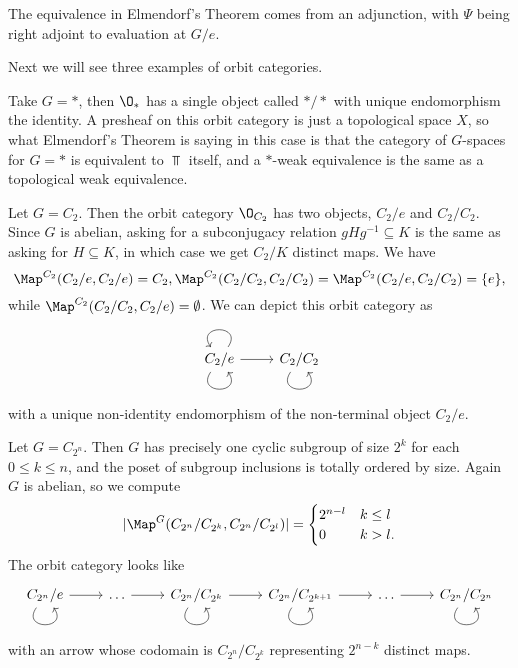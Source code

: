 \begin{remark}
    The equivalence in Elmendorf's Theorem comes from an adjunction, with $\Psi$ being right adjoint to evaluation at $G/e$.
\end{remark}

Next we will see three examples of orbit categories. 

\begin{example}[$\O_*$]
    Take $G = *$, then $\O_*$ has a single object called $*/*$ with unique endomorphism the identity. A presheaf on this orbit category is just a topological space $X$, so what Elmendorf's Theorem is saying in this case is that the category of $G$-spaces for $G = *$ is equivalent to $\Top$ itself, and a $*$-weak equivalence is the same as a topological weak equivalence.
\end{example}

\begin{example}[$\O_{C_2}$] Let $G = C_2$. Then the orbit category $\O_{C_2}$ has two objects, $C_2/e$ and $C_2/C_2$. Since $G$ is abelian, asking for a subconjugacy relation $gHg^{-1} \subseteq K$ is the same as asking for $H \subseteq K$, in which case we get $C_2/K$ distinct maps. We have 
    \[\Map^{C_2}(C_2/e, C_2/e) = C_2, \Map^{C_2}(C_2/C_2, C_2/C_2) = \Map^{C_2}(C_2/e, C_2/C_2) = \{e\},\]
    while $\Map^{C_2}(C_2/C_2, C_2/e) = \emptyset$. We can depict this orbit category as 
    \[\begin{tikzcd}
        C_2/e \arrow[r] \arrow[loop, distance=2em, in=305, out=235] \arrow[loop, distance=2em, in=125, out=55] & C_2/C_2 \arrow[loop, distance=2em, in=305, out=235]
        \end{tikzcd}\]
    with a unique non-identity endomorphism of the non-terminal object $C_2/e$.
\end{example}

\begin{example}[$\O_{C_{2^n}}$]\label{ex: orbit of C2n}
    Let $G = C_{2^n}$. Then $G$ has precisely one cyclic subgroup of size $2^k$ for each $0 \leq k \leq n$, and the poset of subgroup inclusions is totally ordered by size. Again $G$ is abelian, so we compute 
    \[|\Map^G(C_{2^n}/C_{2^k}, C_{2^n}/C_{2^l})| = \begin{cases} 2^{n-l} & k \leq l \\ 0 & k > l. \end{cases}\] 
    The orbit category looks like
    \[\begin{tikzcd}
    C_{2^n}/e \arrow[r] \arrow[loop, distance=2em, in=305, out=235] & \ldots \arrow[r] & C_{2^n}/C_{2^k} \arrow[r] \arrow[loop, distance=2em, in=305, out=235] & C_{2^n}/C_{2^{k+1}} \arrow[loop, distance=2em, in=305, out=235] \arrow[r] & \ldots \arrow[r] & C_{2^n}/C_{2^n} \arrow[loop, distance=2em, in=305, out=235]
    \end{tikzcd}\]
    with an arrow whose codomain is $C_{2^n}/C_{2^k}$ representing $2^{n-k}$ distinct maps. 
\end{example}

